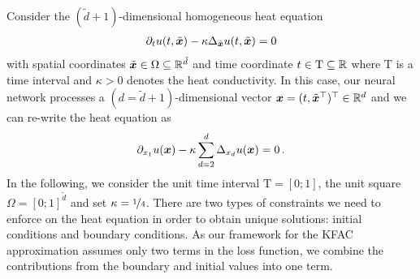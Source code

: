Consider the $(\tilde{d}+1)$-dimensional homogeneous heat equation
\begin{align*}
  \partial_{t} u(t, \tilde{{\bm{x}}})
  -
  \kappa \Delta_{\tilde{{\bm{x}}}} u(t, \tilde{{\bm{x}}})
  =
  0
\end{align*}
with spatial coordinates $\tilde{{\bm{x}}} \in \Omega \subseteq {\mathbb{R}}^{\tilde{d}}$ and time coordinate $t \in \mathrm{T} \subseteq {\mathbb{R}}$ where $\mathrm{T}$ is a time interval and $\kappa >0$ denotes the heat conductivity. In this case, our neural network processes a $(d = \tilde{d} +1)$-dimensional vector ${\bm{x}} = ( t,  \tilde{{\bm{x}}}^{\top} )^{\top} \in {\mathbb{R}}^d$ and we can re-write the heat equation as
\begin{align*}
  \partial_{{x}_1} u({\bm{x}})
  -
  \kappa \sum_{d=2}^{d} \Delta_{{x}_d} u({\bm{x}})
  =
  0\,.
\end{align*}
In the following, we consider the unit time interval $\mathrm{T} = [0;1]$, the unit square $\Omega = [0;1]^{\tilde{d}}$ and set $\kappa = \nicefrac{1}{4}$.
There are two types of constraints we need to enforce on the heat equation in order to obtain unique solutions: initial conditions and boundary conditions.
As our framework for the KFAC approximation assumes only two terms in the loss function, we combine the contributions from the boundary and initial values into one term.

